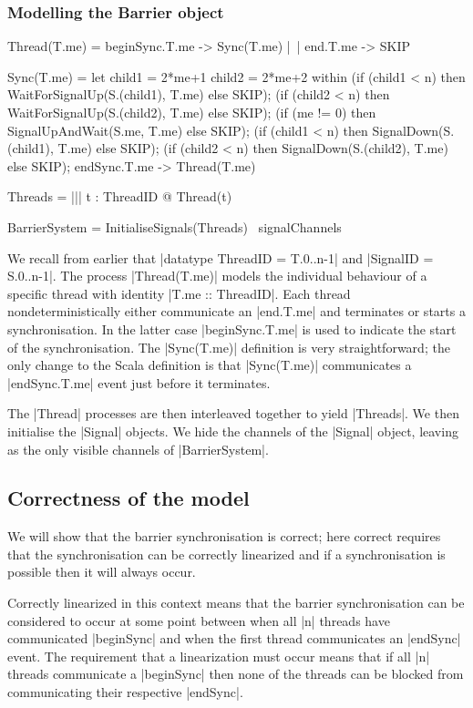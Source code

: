 \subsubsection{Modelling the Barrier object}
\inlineCSP
\begin{cspm}[caption={The CSP model of a thread interacting with the {\scalastyle Barrier} object}]
Thread(T.me) = beginSync.T.me -> Sync(T.me) |~| end.T.me -> SKIP

Sync(T.me) = 
  let child1 = 2*me+1 
      child2 = 2*me+2
  within 
      (if (child1 < n) then WaitForSignalUp(S.(child1), T.me) else SKIP);
      (if (child2 < n) then WaitForSignalUp(S.(child2), T.me) else SKIP);
      (if (me != 0) then SignalUpAndWait(S.me, T.me) else SKIP);
      (if (child1 < n) then SignalDown(S.(child1), T.me) else SKIP);
      (if (child2 < n) then SignalDown(S.(child2), T.me) else SKIP);
      endSync.T.me -> Thread(T.me)

Threads = ||| t : ThreadID @ Thread(t)

BarrierSystem = InitialiseSignals(Threads) \ signalChannels
\end{cspm}

We recall from earlier that |datatype ThreadID = T.{0..n-1}| and |SignalID = S.{0..n-1}|. The process |Thread(T.me)| models the individual behaviour of a specific thread with identity |T.me :: ThreadID|. Each thread nondeterministically either communicate an |end.T.me| and terminates or starts a synchronisation. In the latter case |beginSync.T.me| is used to indicate the start of the synchronisation. The |Sync(T.me)| definition is very straightforward; the only change to the Scala definition is that |Sync(T.me)| communicates a |endSync.T.me| event just before it terminates.

The |Thread| processes are then interleaved together to yield |Threads|. We then initialise the |Signal| objects. We hide the channels of the |Signal| object, leaving  as the only visible channels of |BarrierSystem|.

\subsection{Correctness of the model}

We will show that the barrier synchronisation is correct; here correct requires that the synchronisation can be correctly linearized and if a synchronisation is possible then it will always occur. 

Correctly linearized in this context means that the barrier synchronisation can be considered to occur at some point between when all |n| threads have communicated |beginSync| and when the first thread communicates an |endSync| event. The requirement that a linearization must occur means that if all |n| threads communicate a |beginSync| then none of the threads can be blocked from communicating their respective |endSync|.


